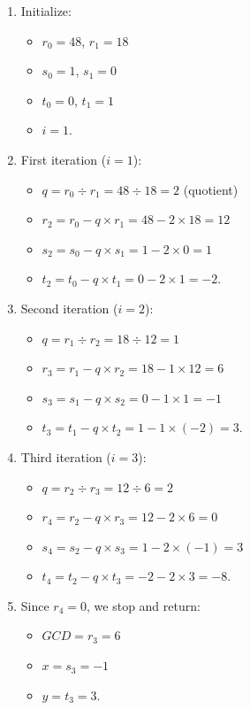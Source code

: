 \documentclass[
  letterpaper,
  DIV=11,
  numbers=noendperiod,
  oneside]{scrartcl}
\providecommand{\tightlist}{%
  \setlength{\itemsep}{0pt}\setlength{\parskip}{0pt}}\usepackage{longtable,booktabs,array}
\begin{document}
\begin{enumerate}
\def\labelenumi{\arabic{enumi}.}
\tightlist
\item
  Initialize:

  \begin{itemize}
  \tightlist
  \item
    \(r_0 = 48\), \(r_1 = 18\)
  \item
    \(s_0 = 1\), \(s_1 = 0\)
  \item
    \(t_0 = 0\), \(t_1 = 1\)
  \item
    \(i = 1\).
  \end{itemize}
\item
  First iteration (\(i = 1\)):

  \begin{itemize}
  \tightlist
  \item
    \(q = r_0 \div r_1 = 48 \div 18 = 2\) (quotient)
  \item
    \(r_2 = r_0 - q \times r_1 = 48 - 2 \times 18 = 12\)
  \item
    \(s_2 = s_0 - q \times s_1 = 1 - 2 \times 0 = 1\)
  \item
    \(t_2 = t_0 - q \times t_1 = 0 - 2 \times 1 = -2\).
  \end{itemize}
\item
  Second iteration (\(i = 2\)):

  \begin{itemize}
  \tightlist
  \item
    \(q = r_1 \div r_2 = 18 \div 12 = 1\)
  \item
    \(r_3 = r_1 - q \times r_2 = 18 - 1 \times 12 = 6\)
  \item
    \(s_3 = s_1 - q \times s_2 = 0 - 1 \times 1 = -1\)
  \item
    \(t_3 = t_1 - q \times t_2 = 1 - 1 \times (-2) = 3\).
  \end{itemize}
\item
  Third iteration (\(i = 3\)):

  \begin{itemize}
  \tightlist
  \item
    \(q = r_2 \div r_3 = 12 \div 6 = 2\)
  \item
    \(r_4 = r_2 - q \times r_3 = 12 - 2 \times 6 = 0\)
  \item
    \(s_4 = s_2 - q \times s_3 = 1 - 2 \times (-1) = 3\)
  \item
    \(t_4 = t_2 - q \times t_3 = -2 - 2 \times 3 = -8\).
  \end{itemize}
\item
  Since \(r_4 = 0\), we stop and return:

  \begin{itemize}
  \tightlist
  \item
    \(GCD = r_3 = 6\)
  \item
    \(x = s_3 = -1\)
  \item
    \(y = t_3 = 3\).
  \end{itemize}
\end{enumerate}
\end{document}
